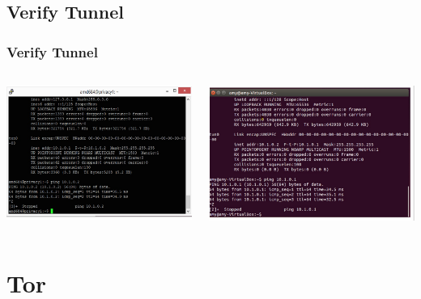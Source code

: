 \documentclass{beamer}
\begin{document}
\subsection{Verify Tunnel}
\begin{frame}
\frametitle{Verify Tunnel}
\begin{columns}
    \begin{column}{0.48\textwidth}
        \includegraphics[width=.9\linewidth]{left}
    \end{column}
    \begin{column}{.5\textwidth}
        \includegraphics[width=.9\linewidth]{right}
    \end{column}
\end{columns}
\end{frame}


\section{Tor}
\end{document}
